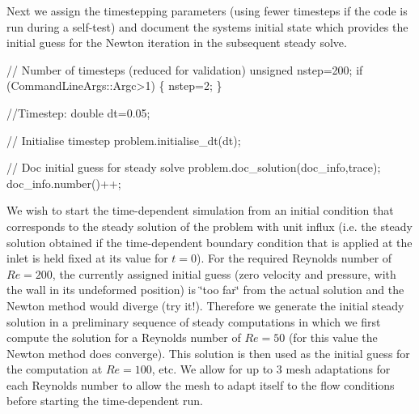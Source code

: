 

Next we assign the timestepping parameters (using fewer timesteps if the code is run during a self-\/test) and document the system\textquotesingle{}s initial state which provides the initial guess for the Newton iteration in the subsequent steady solve.


\begin{DoxyCodeInclude}


 \textcolor{comment}{// Number of timesteps (reduced for validation)}
 \textcolor{keywordtype}{unsigned} nstep=200;
 \textcolor{keywordflow}{if} (CommandLineArgs::Argc>1)
  \{
   nstep=2;
  \}

 \textcolor{comment}{//Timestep: }
 \textcolor{keywordtype}{double} dt=0.05;
 
 \textcolor{comment}{// Initialise timestep }
 problem.initialise\_dt(dt);

 \textcolor{comment}{// Doc initial guess for steady solve}
 problem.doc\_solution(doc\_info,trace);
 doc\_info.number()++; 

\end{DoxyCodeInclude}


We wish to start the time-\/dependent simulation from an initial condition that corresponds to the steady solution of the problem with unit influx (i.\+e. the steady solution obtained if the time-\/dependent boundary condition that is applied at the inlet is held fixed at its value for $ t= 0 $). For the required Reynolds number of $ Re=200 $, the currently assigned initial guess (zero velocity and pressure, with the wall in its undeformed position) is \char`\"{}too far\char`\"{} from the actual solution and the Newton method would diverge (try it!). Therefore we generate the initial steady solution in a preliminary sequence of steady computations in which we first compute the solution for a Reynolds number of $ Re=50 $ (for this value the Newton method does converge). This solution is then used as the initial guess for the computation at $ Re=100 $, etc. We allow for up to 3 mesh adaptations for each Reynolds number to allow the mesh to adapt itself to the flow conditions before starting the time-\/dependent run.


